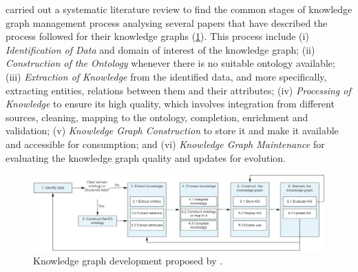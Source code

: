 \cite{tamavsauskaite2023defining} carried out a systematic literature review to find the common stages of knowledge graph management process analysing several papers that have described the process followed for their knowledge graphs (\cref{fig:chp2_kg-dev-process}). This process include  
(i) \textit{Identification of Data} and domain of interest of the knowledge graph;
(ii) \textit{Construction of the Ontology} whenever there is no suitable ontology available;
(iii) \textit{Extraction of Knowledge} from the identified data, and more specifically, extracting entities, relations between them and their attributes;
(iv) \textit{Processing of Knowledge} to ensure its high quality, which involves integration from different sources, cleaning, mapping to the ontology, completion, enrichment and validation;
(v) \textit{Knowledge Graph Construction} to store it and make it available and accessible for consumption;
and (vi) \textit{Knowledge Graph Maintenance} for evaluating the knowledge graph quality and updates for evolution.


\begin{figure}[]
\centering
\includegraphics[width=\linewidth]{figures/chp2_kg-dev-process.png}
\caption{Knowledge graph development proposed by \cite{tamavsauskaite2023defining}.}
\label{fig:chp2_kg-dev-process}
\end{figure}


